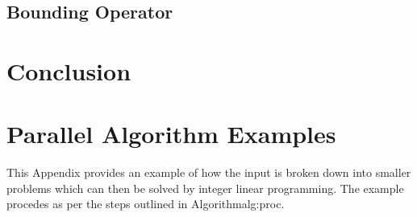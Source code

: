 \documentclass[10pt,twocolumn]{witseiepaper}
\begin{document}
\subsection{Bounding Operator}




\section{Conclusion} \label{sec:conc}




\clearpage 

\appendix

\section{Parallel Algorithm Examples }

This Appendix provides an example of how the input is broken down into smaller problems which can then be 
solved by integer linear programming. The example procedes as per the steps outlined in Algorithm{alg:proc}.
\end{document}
